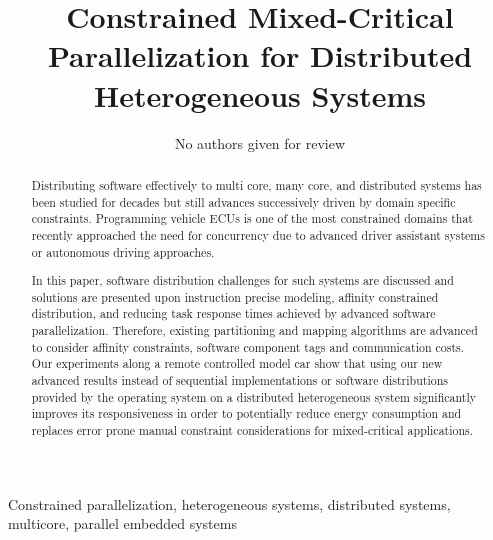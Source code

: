 \documentclass [a4paper,final,conference,10pt]{IDAACS}
\title{Constrained Mixed-Critical Parallelization for Distributed Heterogeneous Systems}
\author{
	No authors given for review
}
\begin{document}
\maketitle

\let\thefootnote\relax{}

\begin{abstract}
Distributing software effectively to multi core, many core, and distributed systems has been studied for decades but still advances successively driven by domain specific constraints. 
Programming vehicle ECUs is one of the most constrained domains that %
recently approached the need for concurrency due to advanced driver assistant systems or autonomous driving approaches. 

In this paper, software distribution challenges for such systems are discussed and solutions are presented upon instruction precise modeling, affinity constrained distribution, and reducing task response times achieved by advanced software parallelization. 
Therefore, existing partitioning and mapping algorithms are advanced to consider affinity constraints, software component tags and communication costs.
Our experiments along a remote controlled model car show that using our new advanced results instead of sequential implementations or software distributions provided by the operating system
on a distributed heterogeneous system %
significantly improves its responsiveness in order to potentially reduce energy consumption and replaces error prone manual constraint considerations for mixed-critical applications.  
\end{abstract}

\begin{IEEEkeywords}
Constrained parallelization, heterogeneous systems, distributed systems, multicore, parallel embedded systems
\end{IEEEkeywords}
\end{document}
